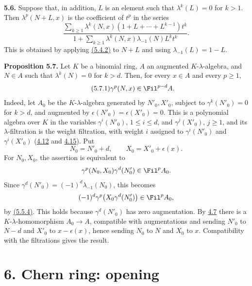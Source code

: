 \textbf{5.6.} Suppose that, in addition, \(L\) is an element such that \(\lambda^k(L)=0\) for \(k>1\). Then \(\lambda^p(N+L,x)\) is the coefficient of \(t^p\) in the series
\begin{equation}\tag{5.6.1}
  \frac{\displaystyle\sum_{k\ge1}\lambda^k(N,x)
        (1+L+\cdots+L^{k-1})t^k}
       {\displaystyle 1+\sum_{k\ge1}\lambda^k(N,x)
        \lambda_{-1}(N)L^k t^k}.
\end{equation}
This is obtained by applying \hyperlink{sga6.e05.eq.5-4-2}{(5.4.2)} to \(N+L\) and using \(\lambda_{-1}(L)=1-L\).

\textbf{Proposition 5.7.} Let \(K\) be a binomial ring, \(A\) an augmented \(K\)-\(\lambda\)-algebra, and \(N\in A\) such that \(\lambda^k(N)=0\) for \(k>d\). Then, for every \(x\in A\) and every \(p\ge1\),
\begin{equation}\tag{5.7.1}
  \gamma^p(N,x)\in\Fil^{p-d}A.
\end{equation}
Indeed, let \(A_0\) be the \(K\)-\(\lambda\)-algebra generated by \(N'_0,X'_0\), subject to \(\gamma^k(N'_0)=0\) for \(k>d\), and augmented by \(\epsilon(N'_0)=\epsilon(X'_0)=0\). This is a polynomial algebra over \(K\) in the variables \(\gamma^i(N'_0)\), \(1\le i\le d\), and \(\gamma^j(X'_0)\), \(j\ge1\), and its \(\lambda\)-filtration is the weight filtration, with weight \(i\) assigned to \(\gamma^i(N'_0)\) and \(\gamma^i(X'_0)\) (\hyperlink{sga6.e05.prop.4-12}{4.12} and \hyperlink{sga6.e05.cor.4-15}{4.15}). Put
\[
  N_0=N'_0+d,
  \qquad X_0=X'_0+\epsilon(x).
\]
For \(N_0,X_0\), the assertion is equivalent to
\[
  \gamma^p(N_0,X_0)\gamma^d(N'_0)\in\Fil^pA_0.
\]
Since \(\gamma^d(N'_0)=(-1)^d\lambda_{-1}(N_0)\), this becomes
\[
  (-1)^d\gamma^p\bigl(X_0\gamma^d(N'_0)\bigr)\in\Fil^pA_0,
\]
by \hyperlink{sga6.e05.eq.5-5-2}{(5.5.4)}. This holds because \(\gamma^d(N'_0)\) has zero augmentation. By \hyperlink{sga6.e05.prop.4-7}{4.7} there is a \(K\)-\(\lambda\)-homomorphism \(A_0\to A\), compatible with augmentations and sending \(N'_0\) to \(N-d\) and \(X'_0\) to \(x-\epsilon(x)\), hence sending \(N_0\) to \(N\) and \(X_0\) to \(x\). Compatibility with the filtrations gives the result.

\section*{6. Chern ring: opening}

